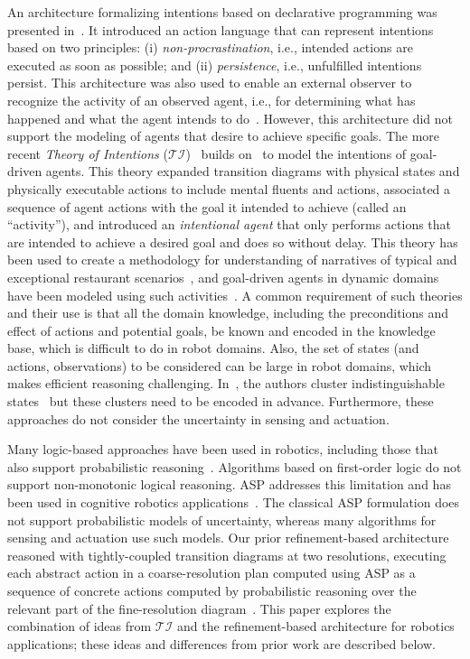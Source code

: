 \documentclass[letterpaper, 10 pt, conference]{ieeeconf}  %
\begin{document}
An architecture formalizing intentions based on declarative
programming was presented in~\cite{baral2005reasoning}. It introduced
an action language that can represent intentions based on two
principles: (i) \emph{non-procrastination}, i.e., intended actions are
executed as soon as possible; and (ii) \emph{persistence}, i.e.,
unfulfilled intentions persist. This architecture was also used to
enable an external observer to recognize the activity of an observed
agent, i.e., for determining what has happened and what the agent
intends to do~\cite{gabaldon2009activity}. However, this architecture
did not support the modeling of agents that desire to achieve specific
goals. The more recent \emph{Theory of Intentions}
($\mathcal{TI}$)~\cite{blount2015theory,blount2014towards} builds
on~\cite{baral2005reasoning} to model the intentions of goal-driven
agents. This theory expanded transition diagrams with physical states
and physically executable actions to include mental fluents and
actions, associated a sequence of agent actions with the goal it
intended to achieve (called an ``activity''), and introduced an
\emph{intentional agent} that only performs actions that are intended
to achieve a desired goal and does so without delay.  This theory has
been used to create a methodology for understanding of narratives of
typical and exceptional restaurant
scenarios~\cite{zhang2017application}, and goal-driven agents in
dynamic domains have been modeled using such
activities~\cite{saribatur2017reactive}. A common requirement of such
theories and their use is that all the domain knowledge, including the
preconditions and effect of actions and potential goals, be known and
encoded in the knowledge base, which is difficult to do in robot
domains. Also, the set of states (and actions, observations) to be
considered can be large in robot domains, which makes efficient
reasoning challenging.  In~\cite{zhang2017application}, the authors
cluster indistinguishable states~\cite{zeynep2016logics} but these
clusters need to be encoded in advance. Furthermore, these approaches
do not consider the uncertainty in sensing and actuation.

Many logic-based approaches have been used in robotics, including
those that also support probabilistic
reasoning~\cite{hanheide:AIJ17,zhang:TRO15}. Algorithms based on
first-order logic do not support non-monotonic logical reasoning. ASP
addresses this limitation and has been used in cognitive robotics
applications~\cite{erdem2012applications,balduccini:iclp14}. The
classical ASP formulation does not support probabilistic models of
uncertainty, whereas many algorithms for sensing and actuation use
such models. Our prior refinement-based architecture reasoned with
tightly-coupled transition diagrams at two resolutions, executing each
abstract action in a coarse-resolution plan computed using ASP as a
sequence of concrete actions computed by probabilistic reasoning over
the relevant part of the fine-resolution
diagram~\cite{sridharan2017refinement,sridharan2016using}. This paper
explores the combination of ideas from $\mathcal{TI}$ and the
refinement-based architecture for robotics applications; these ideas
and differences from prior work are described below.
\end{document}
